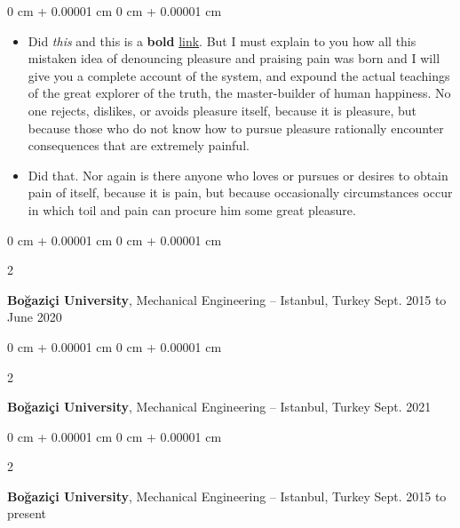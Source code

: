 \documentclass[10pt, letterpaper]{article}
\newenvironment{highlights}{
    \begin{itemize}[
        topsep=0.10 cm,
        parsep=0.10 cm,
        partopsep=0pt,
        itemsep=0pt,
        leftmargin=0 cm + 10pt
    ]
}{
    \end{itemize}
} %
\newenvironment{onecolentry}{
    \begin{adjustwidth}{
        0 cm + 0.00001 cm
    }{
        0 cm + 0.00001 cm
    }
}{
    \end{adjustwidth}
} %
\newenvironment{twocolentry}[2][]{
    \onecolentry
    \def\secondColumn{#2}
    \setcolumnwidth{\fill, 4.5 cm}
    \begin{paracol}{2}
}{
    \switchcolumn \raggedleft \secondColumn
    \end{paracol}
    \endonecolentry
} %
\begin{document}
        \vspace{0.10 cm}
        \begin{onecolentry}
            \begin{highlights}
                \item Did \textit{this} and this is a \textbf{bold} \href{https://example.com}{link}. But I must explain to you how all this mistaken idea of denouncing pleasure and praising pain was born and I will give you a complete account of the system, and expound the actual teachings of the great explorer of the truth, the master-builder of human happiness. No one rejects, dislikes, or avoids pleasure itself, because it is pleasure, but because those who do not know how to pursue pleasure rationally encounter consequences that are extremely painful.
                \item Did that. Nor again is there anyone who loves or pursues or desires to obtain pain of itself, because it is pain, but because occasionally circumstances occur in which toil and pain can procure him some great pleasure.
            \end{highlights}
        \end{onecolentry}


        \vspace{0.2 cm}

        \begin{twocolentry}{
            Sept. 2015 to June 2020
        }
            \textbf{Boğaziçi University}, Mechanical Engineering -- Istanbul, Turkey\end{twocolentry}



        \vspace{0.2 cm}

        \begin{twocolentry}{
            Sept. 2021
        }
            \textbf{Boğaziçi University}, Mechanical Engineering -- Istanbul, Turkey\end{twocolentry}



        \vspace{0.2 cm}

        \begin{twocolentry}{
            Sept. 2015 to present
        }
            \textbf{Boğaziçi University}, Mechanical Engineering -- Istanbul, Turkey\end{twocolentry}
\end{document}
